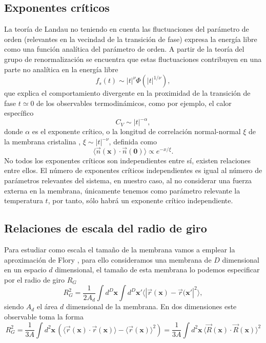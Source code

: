 \subsection{Exponentes críticos}
\label{exponentes_criticos}
La teoría de Landau no teniendo en cuenta las fluctuaciones del parámetro de
orden (relevantes en la vecindad de la transición de fase) expresa la energía
libre como una función analítica del parámetro de orden. A partir de la teoría
del grupo de renormalización \cite{Cardy} se encuentra que estas fluctuaciones contribuyen
en una parte no analítica en la energía libre
\begin{equation}
f_s(t)\sim|t|^{\nu}\Phi(|t|^{1/\nu}),
\end{equation}
que explica el comportamiento divergente en la proximidad de la transición de
fase $t\simeq 0$ de los observables termodinámicos, como por ejemplo, el calor específico
\begin{equation*}
C_V\sim|t|^{-\alpha},
\end{equation*}
donde $\alpha$ es el exponente crítico, o la longitud de correlación
normal-normal $\xi$ de la membrana cristalina \cite{David:normal}, $\xi\sim|t|^{-\nu}$,
definida como
\begin{equation*}
\langle \vec{n}(\mathbf{x})\cdot\vec{n}(\mathbf{0})\rangle\propto e^{-x/\xi}.
\end{equation*}
No todos los exponentes críticos son independientes entre sí, existen
relaciones entre ellos. El número de exponentes críticos independientes es
igual al número de parámetros relevantes del sistema, en nuestro caso, al no
considerar una fuerza externa en la membrana, únicamente tenemos como
parámetro relevante la temperatura $t$, por tanto, sólo habrá un exponente
crítico independiente.

\subsection{Relaciones de escala del radio de giro}

Para estudiar como escala el tamaño de la membrana vamos a emplear la
aproximación de Flory \cite{Gennes:Scaling}, para ello consideramos una
membrana de $D$ dimensional en un espacio 
$d$ dimensional, el tamaño de esta membrana lo podemos especificar por el
radio de giro $R_G$
\begin{equation}
R_G^2=\frac{1}{2A_d}\int d^D\mathbf{x}\int d^D\mathbf{x}' \langle |
\vec{r}(\mathbf{x})-\vec{r}(\mathbf{x}'|^2\rangle, 
\end{equation}
siendo $A_d$ el área $d$ dimensional de la membrana. En dos dimensiones este
observable toma la forma
\begin{equation}
R_G^2=\frac{1}{3A}\int d^2\mathbf{x}\, (\langle
\vec{r}(\mathbf{x})\cdot\vec{r}(\mathbf{x})\rangle-\langle
\vec{r}(\mathbf{x})\rangle^2)=\frac{1}{3A}\int d^2\mathbf{x}\, \langle
\vec{R}(\mathbf{x})\cdot\vec{R}(\mathbf{x})\rangle^2
\end{equation} 

